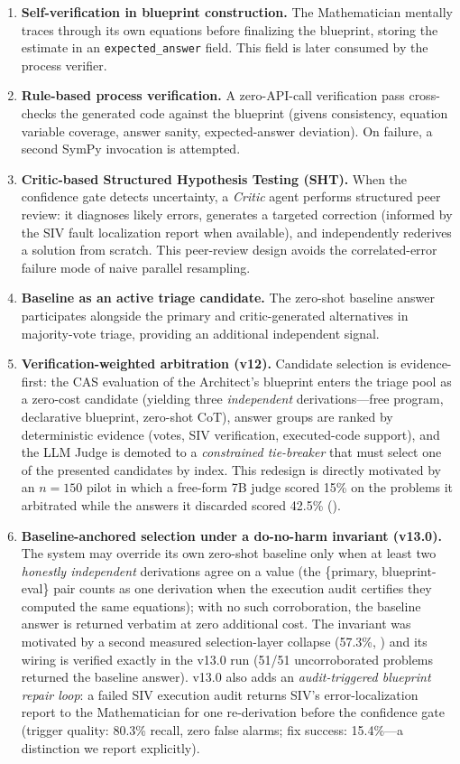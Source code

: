 \documentclass[11pt,a4paper]{article}
\begin{document}
\begin{enumerate}[leftmargin=*,itemsep=3pt]
    \item \textbf{Self-verification in blueprint construction.} The Mathematician mentally traces through its own equations before finalizing the blueprint, storing the estimate in an \texttt{expected\_answer} field. This field is later consumed by the process verifier.
    \item \textbf{Rule-based process verification.} A zero-API-call verification pass cross-checks the generated code against the blueprint (givens consistency, equation variable coverage, answer sanity, expected-answer deviation). On failure, a second SymPy invocation is attempted.
    \item \textbf{Critic-based Structured Hypothesis Testing (SHT).} When the confidence gate detects uncertainty, a \emph{Critic} agent performs structured peer review: it diagnoses likely errors, generates a targeted correction (informed by the SIV fault localization report when available), and independently rederives a solution from scratch. This peer-review design avoids the correlated-error failure mode of naive parallel resampling.
    \item \textbf{Baseline as an active triage candidate.} The zero-shot baseline answer participates alongside the primary and critic-generated alternatives in majority-vote triage, providing an additional independent signal.
    \item \textbf{Verification-weighted arbitration (v12).} Candidate selection is evidence-first: the CAS evaluation of the Architect's blueprint enters the triage pool as a zero-cost candidate (yielding three \emph{independent} derivations---free program, declarative blueprint, zero-shot CoT), answer groups are ranked by deterministic evidence (votes, SIV verification, executed-code support), and the LLM Judge is demoted to a \emph{constrained tie-breaker} that must select one of the presented candidates by index. This redesign is directly motivated by an $n{=}150$ pilot in which a free-form 7B judge scored 15\% on the problems it arbitrated while the answers it discarded scored 42.5\% ().
    \item \textbf{Baseline-anchored selection under a do-no-harm invariant (v13.0).} The system may override its own zero-shot baseline only when at least two \emph{honestly independent} derivations agree on a value (the \{primary, blueprint-eval\} pair counts as one derivation when the execution audit certifies they computed the same equations); with no such corroboration, the baseline answer is returned verbatim at zero additional cost. The invariant was motivated by a second measured selection-layer collapse (57.3\%, ) and its wiring is verified exactly in the v13.0 run (51/51 uncorroborated problems returned the baseline answer). v13.0 also adds an \emph{audit-triggered blueprint repair loop}: a failed SIV execution audit returns SIV's error-localization report to the Mathematician for one re-derivation before the confidence gate (trigger quality: 80.3\% recall, zero false alarms; fix success: 15.4\%---a distinction we report explicitly).

\end{enumerate}
\end{document}
